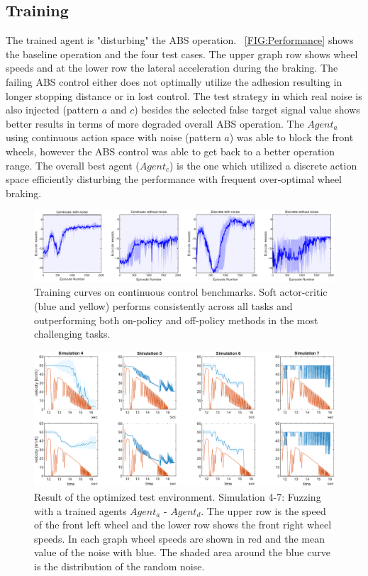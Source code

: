 \documentclass[a4paper, fleqn]{template/cas-dc}
\begin{document}
	\subsection{Training}
	The trained agent is "disturbing" the ABS operation. ~\autoref{FIG:Performance} shows the baseline operation and the four test cases. The upper graph row shows wheel speeds and at the lower row the lateral acceleration during the braking. The failing ABS control either does not optimally utilize the adhesion resulting in longer stopping distance or in lost control. The test strategy in which real noise is also injected (pattern $a$ and $c$) besides the selected false target signal value shows better results in terms of more degraded overall ABS operation. The $Agent_a$ using continuous action space with noise (pattern $a$) was able to block the front wheels, however the ABS control was able to get back to a better operation range. The overall best agent ($Agent_c$) is the one which utilized a discrete action space efficiently disturbing the performance with frequent over-optimal wheel braking.
	
	\begin{figure}[hb]
		\centering
		\includegraphics[width=\textwidth]{figures/SAC_all_statistics.pdf}
		\caption{Training curves on continuous control benchmarks. Soft actor-critic (blue and yellow) performs
			consistently across all tasks and outperforming both on-policy and off-policy methods in the most challenging
			tasks.}
		\label{FIG:TrainingResult}
	\end{figure}		
	
	\begin{figure}[h]
		\centering
		\includegraphics[width=\textwidth]{figures/SAC_all_wheelspeeds.pdf}
		\caption{Result of the optimized test environment. Simulation 4-7: Fuzzing with a trained agents $Agent_a$ - $Agent_d$. The upper row is the speed of the front left wheel and the lower row shows the front right wheel speeds. In each graph wheel speeds are shown in red and the mean value of the noise with blue. The shaded area around the blue curve is the distribution of the random noise.}
		\label{FIG:TestResults}
	\end{figure}	
	
\end{document}
